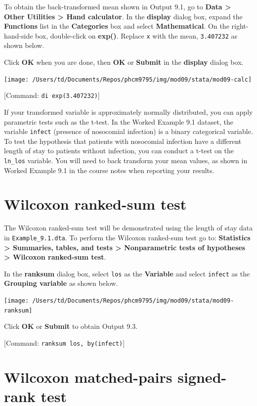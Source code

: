 \documentclass[
]{memoir}
\begin{document}
To obtain the back-transformed mean shown in Output 9.1, go to \textbf{Data \textgreater{} Other Utilities \textgreater{} Hand calculator}. In the \textbf{display} dialog box, expand the \textbf{Functions} list in the \textbf{Categories} box and select \textbf{Mathematical}. On the right-hand-side box, double-click on \textbf{exp()}. Replace \texttt{x} with the mean, \texttt{3.407232} as shown below.

Click \textbf{OK} when you are done, then \textbf{OK} or \textbf{Submit} in the \textbf{display} dialog box.

\texttt{[image: /Users/td/Documents/Repos/phcm9795/img/mod09/stata/mod09-calc]}

{[}Command: \texttt{di\ exp(3.407232)}{]}

If your transformed variable is approximately normally distributed, you can apply parametric tests such as the t-test. In the Worked Example 9.1 dataset, the variable \texttt{infect} (presence of nosocomial infection) is a binary categorical variable. To test the hypothesis that patients with nosocomial infection have a different length of stay to patients without infection, you can conduct a t-test on the \texttt{ln\_los} variable. You will need to back transform your mean values, as shown in Worked Example 9.1 in the course notes when reporting your results.

\hypertarget{wilcoxon-ranked-sum-test}{%
\section{Wilcoxon ranked-sum test}\label{wilcoxon-ranked-sum-test}}

The Wilcoxon ranked-sum test will be demonstrated using the length of stay data in \texttt{Example\_9.1.dta}. To perform the Wilcoxon ranked-sum test go to: \textbf{Statistics \textgreater{} Summaries, tables, and tests \textgreater{} Nonparametric tests of hypotheses \textgreater{} Wilcoxon ranked-sum test}.

In the \textbf{ranksum} dialog box, select \texttt{los} as the \textbf{Variable} and select \texttt{infect} as the \textbf{Grouping variable} as shown below.

\texttt{[image: /Users/td/Documents/Repos/phcm9795/img/mod09/stata/mod09-ranksum]}

Click \textbf{OK} or \textbf{Submit} to obtain Output 9.3.

{[}Command: \texttt{ranksum\ los,\ by(infect)}{]}

\hypertarget{wilcoxon-matched-pairs-signed-rank-test}{%
\section{Wilcoxon matched-pairs signed-rank test}\label{wilcoxon-matched-pairs-signed-rank-test}}
\end{document}
